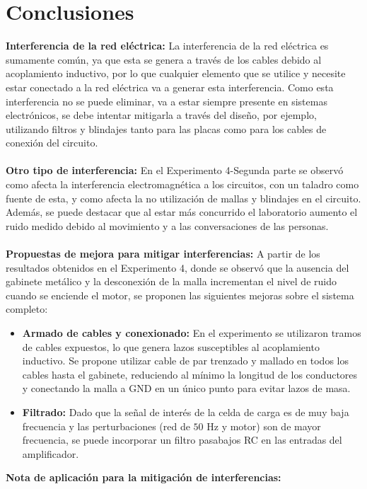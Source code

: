 \section{Conclusiones}
\textbf{Interferencia de la red eléctrica:}
La interferencia de la red eléctrica es sumamente común, ya que esta se genera a través de los cables debido al acoplamiento inductivo, por lo que cualquier elemento que se utilice y necesite estar conectado a la red eléctrica va a generar esta interferencia. Como esta interferencia no se puede eliminar, va a estar siempre presente en sistemas electrónicos, se debe intentar mitigarla a través del diseño, por ejemplo, utilizando filtros y blindajes tanto para las placas como para los cables de conexión del circuito. \\
\\
\textbf{Otro tipo de interferencia:}
En el Experimento 4-Segunda parte se observó como afecta la interferencia electromagnética a los circuitos, con un taladro como fuente de esta, y como afecta la no utilización de mallas y blindajes en el circuito. Además, se puede destacar que al estar más concurrido el laboratorio aumento el ruido medido debido al movimiento y a las conversaciones de las personas.\\
\\
\textbf{Propuestas de mejora para mitigar interferencias:} A partir de los resultados obtenidos en el Experimento 4, donde se observó que la ausencia del gabinete metálico y la desconexión de la malla incrementan el nivel de ruido cuando se enciende el motor, se proponen las siguientes mejoras sobre el sistema completo:
\begin{itemize}
    \item \textbf{Armado de cables y conexionado:} En el experimento se utilizaron tramos de cables expuestos, lo que genera lazos susceptibles al acoplamiento inductivo. Se propone utilizar cable de par trenzado y mallado en todos los cables hasta el gabinete, reduciendo al mínimo la longitud de los conductores y conectando la malla a GND en un único punto para evitar lazos de masa.
    \item \textbf{Filtrado:} Dado que la señal de interés de la celda de carga es de muy baja frecuencia y las perturbaciones (red de $50\text{ Hz}$ y motor) son de mayor frecuencia, se puede incorporar un filtro pasabajos RC en las entradas del amplificador.\\
\end{itemize} 

\textbf{Nota de aplicación para la mitigación de interferencias:}

